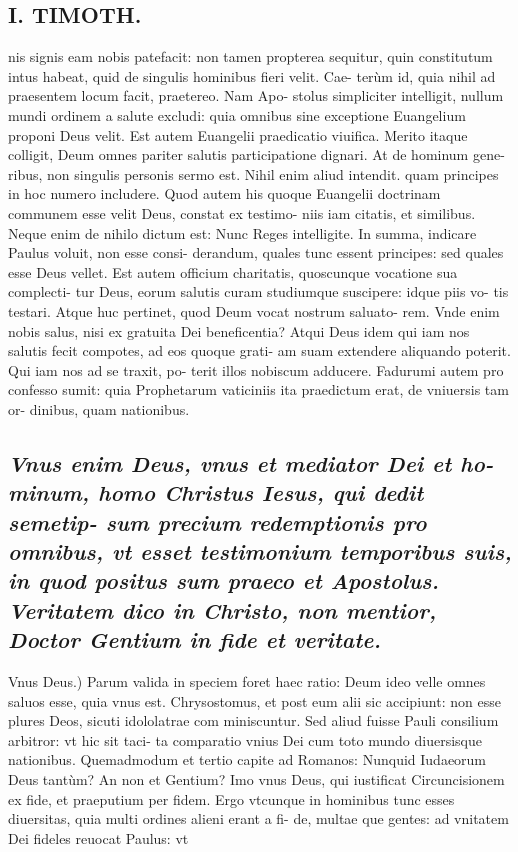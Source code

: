\documentclass{article}
\begin{document}
\begin{pages}
\section*{I. TIMOTH. }
\marginpar{[ p.80 ]}\pstart nis signis eam nobis patefacit: non tamen propterea sequitur, quin constitutum intus habeat, quid de singulis hominibus fieri velit. Cae- terùm id, quia nihil ad praesentem locum facit, praetereo. Nam Apo- stolus simpliciter intelligit, nullum mundi ordinem a salute excludi: quia omnibus sine exceptione Euangelium proponi Deus velit. Est autem Euangelii praedicatio viuifica. Merito itaque colligit, Deum omnes pariter salutis participatione dignari. At de hominum gene- ribus, non singulis personis sermo est. Nihil enim aliud intendit. quam principes in hoc numero includere. Quod autem his quoque Euangelii doctrinam communem esse velit Deus, constat ex testimo- niis iam citatis, et similibus. Neque enim de nihilo dictum est: Nunc Reges intelligite. In summa, indicare Paulus voluit, non esse consi- derandum, quales tunc essent principes: sed quales esse Deus vellet. Est autem officium charitatis, quoscunque vocatione sua complecti- tur Deus, eorum salutis curam studiumque suscipere: idque piis vo- tis testari. Atque huc pertinet, quod Deum vocat nostrum saluato- rem. Vnde enim nobis salus, nisi ex gratuita Dei beneficentia? Atqui Deus idem qui iam nos salutis fecit compotes, ad eos quoque grati- am suam extendere aliquando poterit. Qui iam nos ad se traxit, po- terit illos nobiscum adducere. Fadurumi autem pro confesso sumit: quia Prophetarum vaticiniis ita praedictum erat, de vniuersis tam or- dinibus, quam nationibus.  \pend
{}
{}
\subsection*{\textit{Vnus enim Deus, vnus et mediator Dei et ho- minum, homo Christus Iesus, qui dedit semetip- sum precium redemptionis pro omnibus, vt esset testimonium temporibus suis, in quod positus sum praeco et Apostolus. Veritatem dico in Christo, non mentior, Doctor Gentium in fide et veritate. }}\pstart Vnus Deus.) Parum valida in speciem foret haec ratio: Deum ideo velle omnes saluos esse, quia vnus est. Chrysostomus, et post eum alii sic accipiunt: non esse plures Deos, sicuti idololatrae com miniscuntur. Sed aliud fuisse Pauli consilium arbitror: vt hic sit taci- ta comparatio vnius Dei cum toto mundo diuersisque nationibus. Quemadmodum et tertio capite ad Romanos: Nunquid Iudaeorum Deus tantùm? An non et Gentium? Imo vnus Deus, qui iustificat Circuncisionem ex fide, et praeputium per fidem. Ergo vtcunque in hominibus tunc esses diuersitas, quia multi ordines alieni erant a fi- de, multae que gentes: ad vnitatem Dei fideles reuocat Paulus: vt  \pend

\end{pages}
\end{document}
